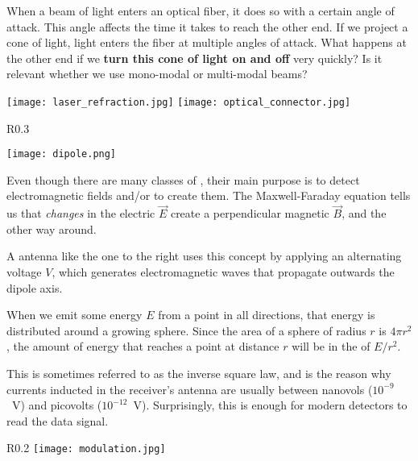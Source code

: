 \begin{exercise}\label{ex:piercing:laser_refraction}
When a beam of light enters an optical fiber, it does so with a certain angle of attack.
This angle affects the time it takes to reach the other end. If we project a cone of light,
light enters the fiber at multiple angles of attack. 
What happens at the other end if we \textbf{turn this cone of light on and off} very quickly?
Is it relevant whether we use mono-modal or multi-modal beams?
% 
\begin{center}
\texttt{[image: laser\_refraction.jpg]}
\texttt{[image: optical\_connector.jpg]}
\end{center}
\end{exercise}
\newpage

\begin{wrapfigure}{R}{0.3\linewidth}
\begin{center}
\texttt{[image: dipole.png]}
\end{center}
\end{wrapfigure}

Even though there are many classes of , their main purpose 
is to detect electromagnetic fields and/or to create them. The Maxwell-Faraday equation tells us
that \textit{changes} in the electric  $\vec{E}$ create a perpendicular magnetic  $\vec{B}$,
and the other way around.

A  antenna like the one to the right uses this concept by applying an alternating voltage $V$,
which generates electromagnetic waves that propagate outwards the dipole axis. 

\begin{remark}
When we emit some energy $E$ from a point in all directions, that energy is distributed around a growing sphere.
Since the area of a sphere of radius $r$ is $4 \pi r^2$, the amount of energy that reaches a point at distance $r$
will be in the  of $E / r^2$.

This is sometimes referred to as the inverse square law, and is
the reason why currents inducted in the receiver's antenna are usually between nanovols 
($10^{-9}$~V) and picovolts ($10^{-12}$~V). Surprisingly, this is enough for modern detectors to read the data signal.
\end{remark}


\begin{wrapfigure}{R}{0.2\linewidth}
 \texttt{[image: modulation.jpg]}
\end{wrapfigure}


